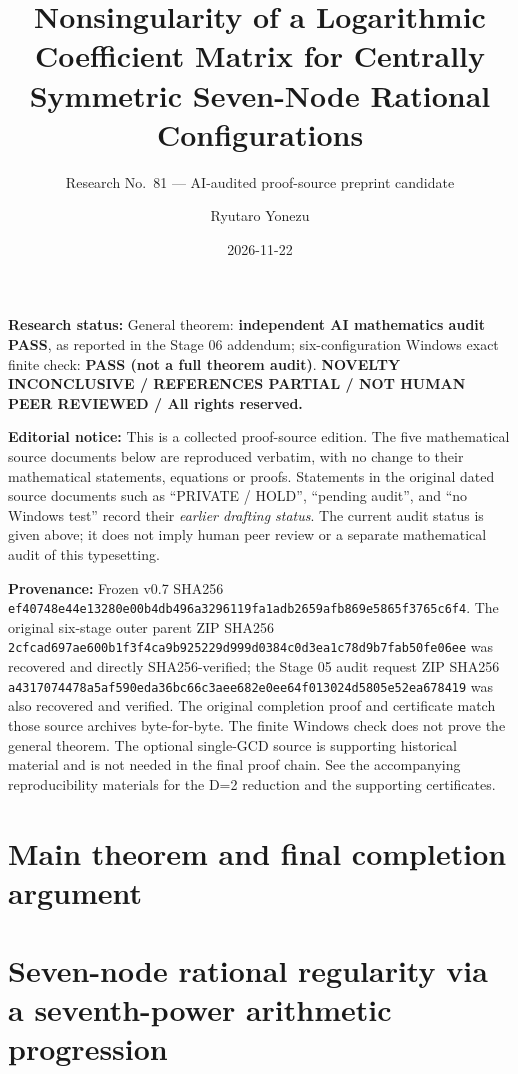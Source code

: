 \documentclass[
  10pt,
]{article}
\title{Nonsingularity of a Logarithmic Coefficient Matrix for Centrally
Symmetric Seven-Node Rational Configurations}
\subtitle{Research No.~81 --- AI-audited proof-source preprint
candidate}
\author{Ryutaro Yonezu}
\date{2026-11-22}
\begin{document}
\maketitle

{
\hypersetup{linkcolor=}
\setcounter{tocdepth}{3}
\tableofcontents
}
\textbf{Research status:} General theorem: \textbf{independent AI
mathematics audit PASS}, as reported in the Stage 06 addendum;
six-configuration Windows exact finite check: \textbf{PASS (not a full
theorem audit)}. \textbf{NOVELTY INCONCLUSIVE / REFERENCES PARTIAL / NOT
HUMAN PEER REVIEWED / All rights reserved.}

\textbf{Editorial notice:} This is a collected proof-source edition. The
five mathematical source documents below are reproduced verbatim, with
no change to their mathematical statements, equations or proofs.
Statements in the original dated source documents such as ``PRIVATE /
HOLD'', ``pending audit'', and ``no Windows test'' record their
\emph{earlier drafting status}. The current audit status is given above;
it does not imply human peer review or a separate mathematical audit of
this typesetting.

\textbf{Provenance:} Frozen v0.7 SHA256
\texttt{ef40748e44e13280e00b4db496a3296119fa1adb2659afb869e5865f3765c6f4}.
The original six-stage outer parent ZIP SHA256
\texttt{2cfcad697ae600b1f3f4ca9b925229d999d0384c0d3ea1c78d9b7fab50fe06ee}
was recovered and directly SHA256-verified; the Stage 05 audit request
ZIP SHA256
\texttt{a4317074478a5af590eda36bc66c3aee682e0ee64f013024d5805e52ea678419}
was also recovered and verified. The original completion proof and
certificate match those source archives byte-for-byte. The finite
Windows check does not prove the general theorem. The optional
single-GCD source is supporting historical material and is not needed in
the final proof chain. See the accompanying reproducibility materials
for the D=2 reduction and the supporting certificates.

\section{Main theorem and final completion
argument}\label{main-theorem-and-final-completion-argument}

\section{Seven-node rational regularity via a seventh-power arithmetic
progression}\label{seven-node-rational-regularity-via-a-seventh-power-arithmetic-progression}
\end{document}
